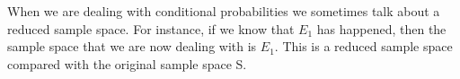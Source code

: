 When we are dealing with conditional probabilities we sometimes talk about a reduced
sample space. For instance, if we know that $E_{1}$  has happened, then
the sample space that we are now dealing with is $E_{1}.$  This is a reduced
sample space compared with the original sample space S.